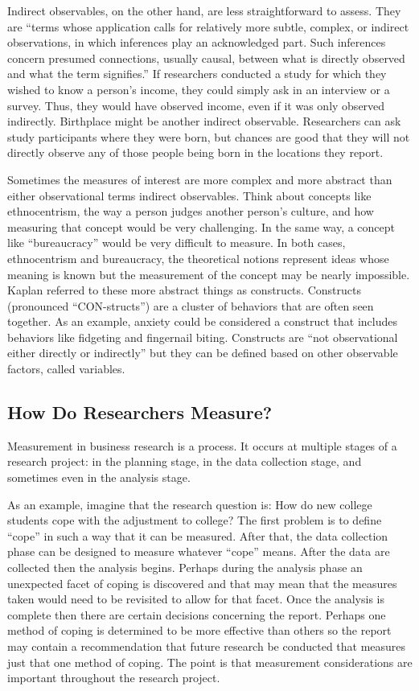 Indirect observables, on the other hand, are less straightforward to assess. They are ``terms whose application calls for relatively more subtle, complex, or indirect observations, in which inferences play an acknowledged part. Such inferences concern presumed connections, usually causal, between what is directly observed and what the term signifies.'' If researchers conducted a study for which they wished to know a person's income, they could simply ask in an interview or a survey. Thus, they would have observed income, even if it was only observed indirectly. Birthplace might be another indirect observable. Researchers can ask study participants where they were born, but chances are good that they will not directly observe any of those people being born in the locations they report.

Sometimes the measures of interest are more complex and more abstract than either observational terms indirect observables. Think about concepts like ethnocentrism, the way a person judges another person's culture, and how measuring that concept would be very challenging. In the same way, a concept like  ``bureaucracy'' would be very difficult to measure. In both cases, ethnocentrism and bureaucracy, the theoretical notions represent ideas whose meaning is known but the measurement of the concept may be nearly impossible. Kaplan referred to these more abstract things as \glspl{construct}. Constructs (pronounced ``CON-structs'') are a cluster of behaviors that are often seen together. As an example, anxiety could be considered a construct that includes behaviors like fidgeting and fingernail biting. Constructs are ``not observational either directly or indirectly'' but they can be defined based on other observable factors, called \glspl{variable}.

\subsection{How Do Researchers Measure?}

Measurement in business research is a process. It occurs at multiple stages of a research project: in the planning stage, in the data collection stage, and sometimes even in the analysis stage. 

As an example, imagine that the research question is: How do new college students cope with the adjustment to college? The first problem is to define ``cope'' in such a way that it can be measured. After that, the data collection phase can be designed to measure whatever ``cope'' means. After the data are collected then the analysis begins. Perhaps during the analysis phase an unexpected facet of coping is discovered and that may mean that the measures taken would need to be revisited to allow for that facet. Once the analysis is complete then there are certain decisions concerning the report. Perhaps one method of coping is determined to be more effective than others so the report may contain a recommendation that future research be conducted that measures just that one method of coping. The point is that measurement considerations are important throughout the research project.

